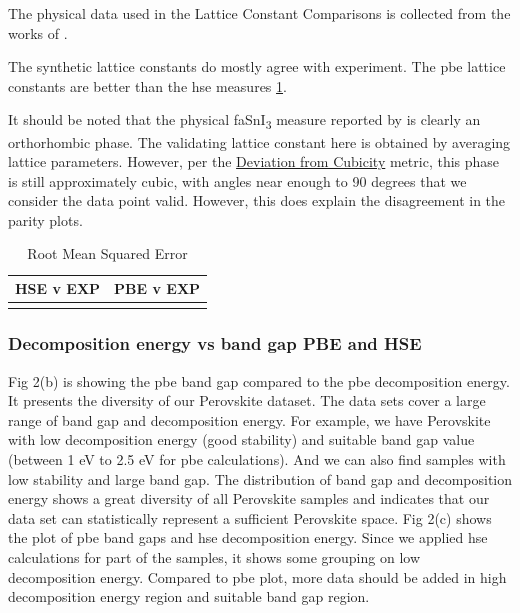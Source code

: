 \documentclass[twoside, twocolumn, 9pt, draft]{article}
\begin{document}
The physical data used in the Lattice Constant Comparisons is
collected from the works of
\citet{briones-2021-accel-lattic,jiang-2006-predic-lattic,chen-2015-under-spotl}.

The synthetic lattice constants do mostly agree with experiment. The
\acrshort{pbe} lattice constants are better than the \acrshort{hse} measures \ref{tbl:verror}.

It should be noted that the physical \acrshort{fa}SnI\textsubscript{3} measure reported by
\citet{chen-2015-under-spotl} is clearly an orthorhombic phase. The
validating lattice constant here is obtained by averaging lattice
parameters. However, per the \hyperref[sec:org7105504]{Deviation from Cubicity} metric, this
phase is still approximately cubic, with angles near enough to 90
degrees that we consider the data point valid. However, this does
explain the disagreement in the parity plots.

\begin{table}[htbp]
\caption{\label{tbl:verror} Root Mean Squared Error}
\centering
\begin{tabular}{ll}
HSE v EXP & PBE v EXP\\
\hline
 & \\
\end{tabular}
\end{table}

\subsubsection*{Decomposition energy vs band gap PBE and HSE}
\label{sec:org27907dd}
Fig 2(b) is showing the \acrshort{pbe} band gap compared to the
\acrshort{pbe} decomposition energy. It presents the diversity
of our Perovskite dataset. The data sets cover a large range of band
gap and decomposition energy. For example, we have Perovskite with low
decomposition energy (good stability) and suitable band gap value
(between 1 eV to 2.5 eV for \acrshort{pbe} calculations). And
we can also find samples with low stability and large band gap. The
distribution of band gap and decomposition energy shows a great
diversity of all Perovskite samples and indicates that our data set
can statistically represent a sufficient Perovskite space. Fig 2(c)
shows the plot of \acrshort{pbe} band gaps and
\acrshort{hse} decomposition energy. Since we applied
\acrshort{hse} calculations for part of the samples, it shows
some grouping on low decomposition energy. Compared to
\acrshort{pbe} plot, more data should be added in high
decomposition energy region and suitable band gap region.
\end{document}
